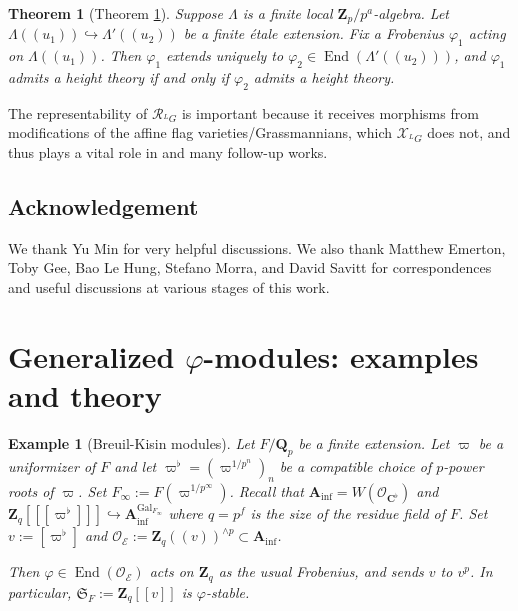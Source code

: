 \documentclass[11pt]{amsart}
\newtheorem{exam}{Example}
\newtheorem{thm}{Theorem}
\numberwithin{thm}{section}
\numberwithin{lem}{section}
\numberwithin{cor}{section}
\numberwithin{prop}{section}
\numberwithin{exam}{section}
\numberwithin{dfn}{section}
\newcommand{\Inf}{{\operatorname{inf}}}
\newcommand{\End}{\operatorname{End}}
\newcommand{\Gal}{\operatorname{Gal}}
\newcommand{\cO}{\mathcal{O}}
\newcommand{\fS}{\mathfrak{S}}
\newcommand{\cX}{\mathcal{X}}
\newcommand{\clR}{\mathcal{R}}
\newcommand{\cE}{{\mathcal{E}}}
\newcommand{\A}{\mathbf{A}}
\newcommand{\Z}{\mathbf{Z}}
\newcommand{\Q}{\mathbf{Q}}
\newcommand{\C}{\mathbf{C}}
\newcommand{\lsup}[2]{{^{#1}\!#2}}
\begin{document}
\begin{thm}[Theorem \ref{thm:propagate}]
Suppose $\Lambda$ is a finite local $\Z_p/p^a$-algebra.
Let $\Lambda(\!(u_1)\!)\hookrightarrow \Lambda'(\!(u_2)\!)$
be a finite \'etale extension.
Fix a Frobenius $\varphi_1$ acting on $\Lambda(\!(u_1)\!)$.
Then $\varphi_1$
extends uniquely to $\varphi_2\in \End(\Lambda'(\!(u_2)\!))$,
and $\varphi_1$ admits a height theory
if and only if $\varphi_2$ admits
a height theory.
\label{thm:propagate}
\end{thm}

The representability of $\clR_{\lsup LG}$
is important
because it receives morphisms
from modifications of the affine flag varieties/Grassmannians,
which
$\cX_{\lsup LG}$ does not,
and thus plays a vital role in \cite{LLHLM}
and many follow-up works.


\subsection{Acknowledgement}
We thank Yu Min for very helpful discussions.
We also thank
Matthew Emerton,
Toby Gee, 
Bao Le Hung, 
Stefano Morra, and
 David Savitt
for correspondences and useful discussions
at various stages of this work.

\section{Generalized $\varphi$-modules: examples
and theory}

\begin{exam}[Breuil-Kisin modules]
\label{ex:BK}
Let $F/\Q_p$ be a finite extension.
Let $\varpi$ be a uniformizer of $F$
and let $\varpi^\flat=(\varpi^{1/p^n})_n$
be a compatible choice
of $p$-power roots of $\varpi$.
Set $F_\infty:=F(\varpi^{1/p^\infty})$.
Recall that
$\A_\Inf=W(\cO_{\C^\flat})$
and
$\Z_q[\![ [\varpi^\flat] ]\!]\hookrightarrow
\A_\Inf^{\Gal_{F_\infty}}$
where $q=p^f$ is the size of the residue field of $F$.
Set $v:=[\varpi^\flat]$
and $\cO_\cE:= \Z_q(\!(v)\!)^{\wedge p}\subset \A_\Inf$.

Then $\varphi\in \End(\cO_\cE)$ acts on $\Z_q$ 
as the usual Frobenius,
and sends $v$ to $v^p$.
In particular, $\fS_F:=\Z_q[\![v]\!]$
is $\varphi$-stable.
\end{exam}
\end{document}
